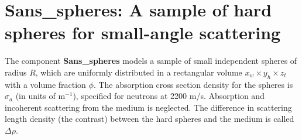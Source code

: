 \section{Sans\_spheres: A sample of hard spheres for small-angle scattering}
\label{sans}


The component {\bf Sans\_spheres} models a sample of small independent
spheres of radius $R$, which are uniformly distributed
in a rectangular volume $x_w \times y_h \times z_t$ with a volume
fraction $\phi$. The absorption cross section density for the spheres
is $\sigma_a$ (in units of m$^{-1}$), specified
for neutrons at 2200 m/s. Absorption and incoherent scattering from the medium
is neglected.
The difference in scattering length density
(the contrast) between the hard spheres and the medium is called $\Delta \rho$.

